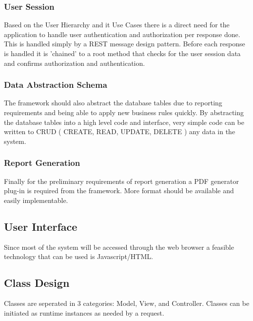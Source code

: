 \documentclass{journal}
\begin{document}
\subsubsection{User Session}

Based on the User Hierarchy and it Use Cases there is a direct need for the application to handle user authentication and authorization per response done. This is handled simply by a REST message design pattern. Before each response is handled it is 'chained' to a root method that checks for the user session data and confirms authorization and authentication.  

\subsubsection{Data Abstraction Schema}

The framework should also abstract the database tables due to reporting requirements and being able to apply new business rules quickly. By abstracting the database tables into a high level code and interface, very simple code can be written to CRUD ( CREATE, READ, UPDATE, DELETE ) any data in the system. 

\subsubsection{Report Generation}
Finally for the preliminary requirements of report generation a PDF generator plug-in is required from the framework. More format should be available and easily implementable. 

\subsection{User Interface}
Since most of the system will be accessed through the web browser a feasible technology that can be used is Javascript/HTML.  

\subsection{Class Design}

Classes are seperated in 3 categories: Model, View, and Controller. Classes can be initiated as runtime instances as needed by a request. 
\end{document}
